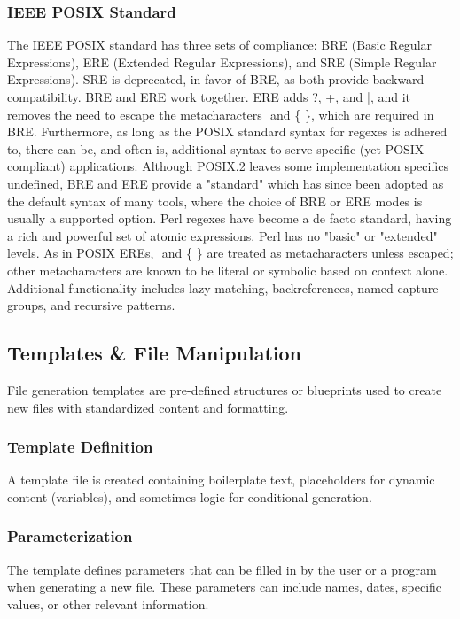 \subsubsection{IEEE POSIX Standard}
The IEEE POSIX standard has three sets of compliance: BRE (Basic Regular Expressions), ERE (Extended Regular Expressions), and SRE (Simple Regular Expressions). SRE is deprecated, in favor of BRE, as both provide backward compatibility.
BRE and ERE work together. ERE adds ?, +, and |, and it removes the need to escape the metacharacters \( \) and \{ \}, which are required in BRE. Furthermore, as long as the POSIX standard syntax for regexes is adhered to, there can be, and often is, additional syntax to serve specific (yet POSIX compliant) applications. Although POSIX.2 leaves some implementation specifics undefined, BRE and ERE provide a "standard" which has since been adopted as the default syntax of many tools, where the choice of BRE or ERE modes is usually a supported option.
Perl regexes have become a de facto standard, having a rich and powerful set of atomic expressions. Perl has no "basic" or "extended" levels. As in POSIX EREs, \( \) and \{ \} are treated as metacharacters unless escaped; other metacharacters are known to be literal or symbolic based on context alone. Additional functionality includes lazy matching, backreferences, named capture groups, and recursive patterns.

\subsection{Templates \& File Manipulation}
File generation templates are pre-defined structures or blueprints used to create new files with standardized content and formatting.
\subsubsection{Template Definition}
A template file is created containing boilerplate text, placeholders for dynamic content (variables), and sometimes logic for conditional generation.
\subsubsection{Parameterization}
The template defines parameters that can be filled in by the user or a program when generating a new file. These parameters can include names, dates, specific values, or other relevant information.
